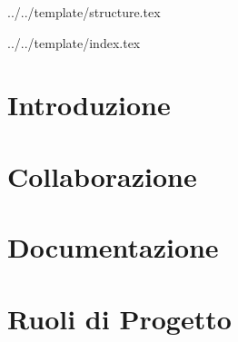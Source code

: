


\def\DOCUMENTO{Norme di Progetto}
\def\VERSIONE{2.0.0}

\def\DESCRIZIONE{Documento contenente l'insieme di norme stabilite dal gruppo \GRUPPO per la realizzazione del progetto didattico \PROGETTO.}

\def\REDATTORE {Suierica Bogdan \\ & Agostinetto Matteo}
\def\VERIFICATORE {Burlin Valerio}
\def\RESPONSABILE {Carraro Nicola}

\def\USO {Interno}

\def\DISTRIBUZIONE {\GRUPPO{}\\ & \COMMITTENTE{}\\}

\def\DESCRIZIONE {Documento contenente l'insieme di norme stabilite dal gruppo \GRUPPO\ per la realizzazione di \PROGETTO.}


\def\INDICE	{true}
\def\TABELLE {false}
\def\FIGURE {true}


 {../../template/structure.tex}



 {../../template/index.tex}


\section{Introduzione}


\newpage
\section{Collaborazione}


\newpage
\section{Documentazione}


\newpage
\section{Ruoli di Progetto}



